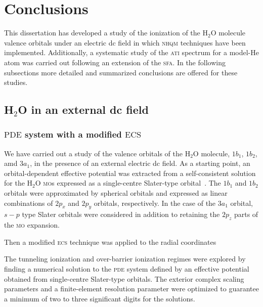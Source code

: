 \chapter{Conclusions}
\label{ch:conclusions}

This dissertation has developed a study of the ionization of the
H$_{2}$O molecule valence orbitals under an electric dc field in which
\textsc{nhqm} techniques have been implemented. Additionally, a
systematic study of the \textsc{ati} spectrum for a model-He atom was
carried out following an extension of the \textsc{sfa}. In the
following subsections more detailed and summarized conclusions are
offered for these studies.

\section{H$_{2}$O in an external dc field}
\label{ch:h2o_results}

\subsection{$\mathrm{PDE}$ system with a modified $\mathrm{ECS}$}



We have carried out a study of the valence orbitals of the H$_{2}$O
molecule, $1b_{1}$, $1b_{2}$, amd $3a_{1}$, in the presence of an
external electric dc field. As a starting point, an orbital-dependent
effective potential was extracted from a self-consistent solution for
the H$_{2}$O \textsc{mo}s expressed as a single-centre Slater-type
orbital~\cite{Moccia_1964}. The $1b_{1}$ and $1b_{2}$ orbitals were
approximated by spherical orbitals and expressed as linear
combinations of $2p_{x}$ and $2p_{y}$ orbitals, respectively. In the
case of the $3a_{1}$ orbital, $s-p$ type Slater orbitals were
considered in addition to retaining the $2p_{z}$ parts of the
\textsc{mo} expansion.

Then a modified \textsc{ecs} technique was
applied to the radial coordinates 



The tunneling ionization and over-barrier
ionization regimes were explored by finding a numerical solution to
the \textsc{pde} system defined by an effective potential obtained
from single-centre Slater-type orbitals. The exterior complex scaling
parameters and a finite-element resolution parameter were optimized to
guarantee a minimum of two to three significant digits for the
solutions.


